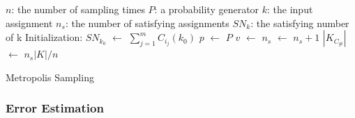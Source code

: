 \IncMargin{1em}
\begin{algorithm}
\SetAlgoLined
\DontPrintSemicolon


$n$: the number of sampling times \;
$P$: a probability generator \;
$k$: the input assignment \;
$n_{s}$: the number of satisfying assignments \;
$SN_k$: the satisfying number of k \; 
Initialization: \;
$SN_{k_0}$ $\leftarrow$ $\sum_{j=1}^{m}C_{i_j}(k_0)$ \;
 {
      $p$ $\leftarrow$ $P$ \;
      {
        $v$ $\leftarrow$  {}
      }
      {$n_{s}$ $\leftarrow$ $n_{s} + 1$}
}
$|K_{C_{gi}}|$ $\leftarrow$ $n_s|K| / n$
\caption{Metropolis Sampling}
\end{algorithm}
\DecMargin{1em}

\subsubsection{Error Estimation}